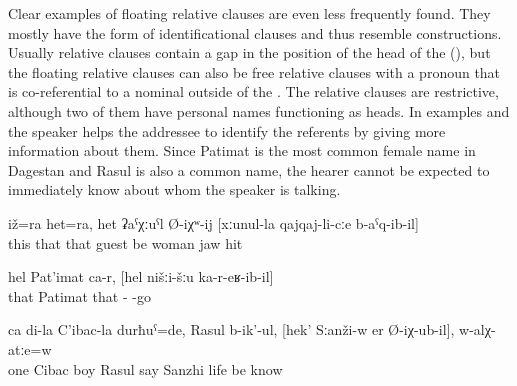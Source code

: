 Clear examples of floating relative clauses are even less frequently found. They mostly have the form of identificational  clauses and thus resemble  constructions. Usually relative clauses contain a gap in the position of the head of the  (), but the floating relative clauses can also be free relative clauses with a pronoun that is co-referential to a nominal outside of the . The relative clauses are restrictive, although two of them have personal names functioning as heads. In examples  and  the speaker helps the addressee to identify the referents by giving more information about them. Since Patimat is the most common female name in Dagestan and Rasul is also a common name, the hearer cannot be expected to immediately know about whom the speaker is talking.
%
\begin{exe}
	\ex	\label{ex:‎This also and this also is probably the man who hit the woman on the jaw}
	\gll	iž=ra	het=ra,	het	ʡaˁχːuˁl	Ø-iχʷ-ij	[xːunul-la	qajqaj-li-cːe	b-aˁq-ib-il]\\
		this	that	that	guest	be	woman	jaw	hit\\
	\glt	{}

	\ex	\label{ex:‎‎That is the Patimat who had come to us. (She is the daughter}
	\gll	hel	Pat'imat	ca-r,	[hel	nišːi-šːu	ka-r-eʁ-ib-il]\\
		that	Patimat		that	- -go\\
	\glt	{}

	\ex	\label{ex:One was the son of my Cibac, his name is Rasul, the one that lived in Sanzhi, do you know him}
	\gll	ca	di-la	C'ibac-la	durħuˁ=de,	Rasul	b-ik'-ul,	[hek'	Sːanži-w er	Ø-iχ-ub-il],	w-alχ-atːe=w	\\
		one		Cibac	boy	Rasul	say		Sanzhi	life	\tsc{m-}be	know\\
	\glt	{}
\end{exe}


